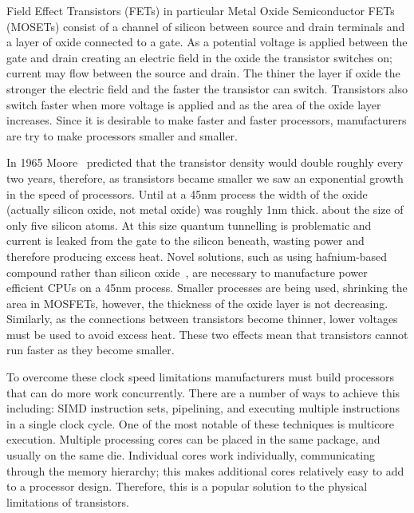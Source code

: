 %
%


Field Effect Transistors (FETs) in particular Metal Oxide Semiconductor FETs
(MOSETs) consist of a channel of silicon between source and drain terminals and
a layer of oxide connected to a gate.
As a potential voltage is applied between the gate and drain creating an
electric field in the oxide
the transistor switches on;
current may flow between the source and drain.
The thiner the layer if oxide the stronger the electric field and the faster
the transistor can switch.
Transistors also switch faster when more voltage is applied
and as the area of the oxide layer increases.
Since it is desirable to make faster and faster processors,
manufacturers are try to make processors smaller and smaller.

In 1965 Moore~\cite{moore} predicted that the transistor 
density would double roughly every two years,
therefore, as transistors became smaller we saw an
exponential growth in the speed of processors.
Until at a 45nm process the width of the oxide
(actually silicon oxide, not metal oxide)
was roughly 1nm thick.
about the size of only five silicon atoms.
At this size quantum tunnelling is problematic and current is leaked from the
gate to the silicon beneath,
wasting power and therefore producing excess heat.
Novel solutions,
such as using hafnium-based compound rather than silicon
oxide~\cite{intel-high-k},
are necessary to manufacture power efficient CPUs on a 45nm process.
Smaller processes are being used, shrinking the area in MOSFETs,
however, the thickness of the oxide layer is not decreasing.
Similarly, as the connections between transistors become thinner,
lower voltages must be used to avoid excess heat.
These two effects mean that transistors cannot run faster as they become
smaller.

To overcome these clock speed limitations manufacturers must build processors
that can do more work concurrently.
There are a number of ways to achieve this including:
SIMD instruction sets,
pipelining,
and executing multiple instructions in a single clock cycle.
One of the most notable of these techniques is multicore execution.
Multiple processing cores can be placed in the same package,
and usually on the same die.
Individual cores work individually, communicating through the memory
hierarchy;
this makes additional cores relatively easy to add to a processor design.
Therefore, this is a popular solution to the physical limitations of
transistors.

